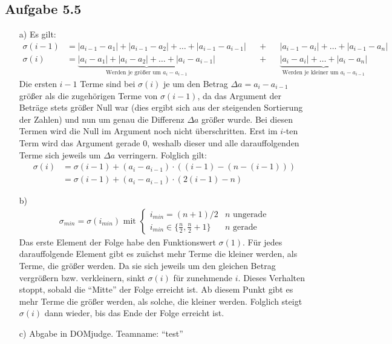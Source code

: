 \documentclass{article}
\begin{document}
    \subsection*{Aufgabe 5.5}
    \begin{enumerate}
        \item[a)] Es gilt:
        \begin{align*}
            \sigma(i-1) &= |a_{i-1} - a_1| + |a_{i-1} - a_2| + \ldots + |a_{i-1} - a_{i-1}|&&+ &&|a_{i-1} - a_{i}| + \ldots + |a_{i-1} - a_n| \\
            \sigma(i) &= \underbrace{|a_{i} - a_1| + |a_{i} - a_2| + \ldots + |a_{i} - a_{i-1}|}_{\text{Werden je größer um } a_i - a_{i-1}} &&+ &&\underbrace{|a_{i} - a_{i}| + \ldots + |a_{i} - a_n|}_{\text{Werden je kleiner um }a_i - a_{i-1}}
        \end{align*}
        Die ersten $i-1$ Terme sind bei $\sigma(i)$ je um den Betrag $\Delta a = a_i - a_{i-1}$ größer als die zugehörigen Terme von $\sigma(i-1)$, da das Argument der Beträge stets größer Null war (dies ergibt sich aus der steigenden Sortierung der Zahlen) und nun um genau die Differenz $\Delta a$ größer wurde. Bei diesen Termen wird die Null im Argument noch nicht überschritten. Erst im $i$-ten Term wird das Argument gerade 0, weshalb dieser und alle darauffolgenden Terme sich jeweils um $\Delta a$ verringern. Folglich gilt:
        \begin{align*}
            \sigma(i) &= \sigma(i-1) + (a_i - a_{i-1}) \cdot ((i-1) - (n-(i-1))) \\
            &= \sigma(i-1) + (a_i - a_{i-1}) \cdot (2(i-1)-n)
        \end{align*}
        \item[b)]
        \begin{align*}
            \sigma_{min} = \sigma(i_{min}) \text{ mit }
            \begin{cases}
                i_{min} = (n+1)/2 & n \text{ ungerade} \\
                i_{min} \in \{\frac{n}{2}, \frac{n}{2} + 1\} & n \text{ gerade}
            \end{cases}
        \end{align*}
        Das erste Element der Folge habe den Funktionswert $\sigma(1)$. Für jedes darauffolgende Element gibt es zuächst mehr Terme die kleiner werden, als Terme, die größer werden. Da sie sich jeweils um den gleichen Betrag vergrößern bzw. verkleinern, sinkt $\sigma(i)$ für zunehmende $i$. Dieses Verhalten stoppt, sobald die "`Mitte"' der Folge erreicht ist. Ab diesem Punkt gibt es mehr Terme die größer werden, als solche, die kleiner werden. Folglich steigt $\sigma(i)$ dann wieder, bis das Ende der Folge erreicht ist. 
        \item[c)] Abgabe in DOMjudge. Teamname: "`test"'
    \end{enumerate}
   
\end{document}
